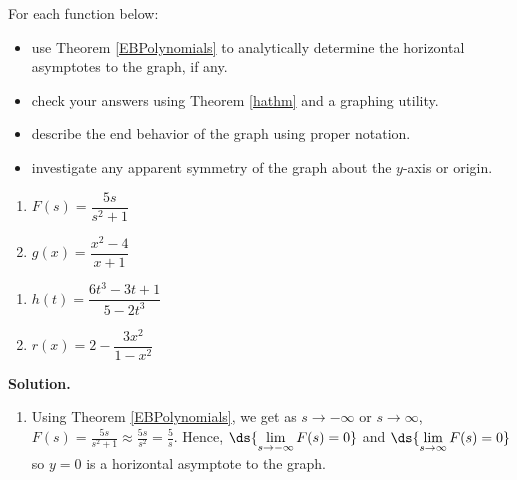\documentclass{ximera}
\begin{document}
\begin{example} \label{haexample} For each function below:

\begin{itemize}

\item use Theorem \ref{EBPolynomials} to  analytically determine the horizontal asymptotes to the graph, if any.

\item check your answers using Theorem \ref{hathm} and a graphing utility.   

\item describe the end behavior of the graph using proper notation.

\item  investigate any apparent symmetry of the graph about the $y$-axis or origin.

\end{itemize}

\begin{enumerate}

\item $F(s) = \dfrac{5s}{s^2+1}$  

\item  $g(x) = \dfrac{x^2-4}{x+1}$ 

\setcounter{HW}{\value{enumi}}
\end{enumerate}

\begin{enumerate}
\setcounter{enumi}{\value{HW}}


\item  $h(t) = \dfrac{6t^3-3t+1}{5-2t^3}$

\item  $r(x) = 2 - \dfrac{3x^2}{1-x^2}$ 

\setcounter{HW}{\value{enumi}}
\end{enumerate}


{ \bf Solution.}

\begin{enumerate}

\item  Using  Theorem \ref{EBPolynomials}, we get as $s \rightarrow  -\infty$ or $s \rightarrow \infty$, $F(s) = \frac{5s}{s^2+1}  \approx \frac{5s}{s^2} = \frac{5}{s}$.  Hence, $\ds{\lim_{s \rightarrow  -\infty} F(s) = 0}$ and $\ds{\lim_{s \rightarrow  \infty} F(s) = 0}$   so $y = 0$ is a horizontal asymptote to the graph.  


\end{enumerate}
\end{example}
\end{document}
